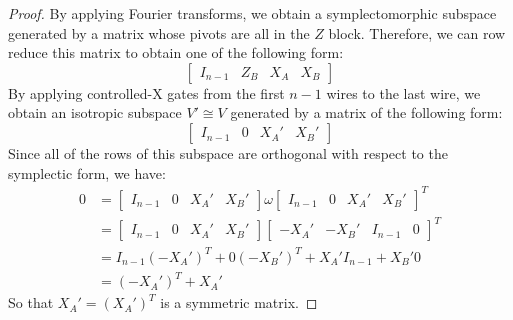 \begin{proof}
By applying Fourier transforms, we obtain a symplectomorphic subspace generated by a matrix whose pivots are all in the $Z$ block.  Therefore, we can row reduce this matrix to obtain one of the following form:
$$
\left[\begin{array}{cc|cc}
I_{n-1} & Z_B & X_A & X_B 
\end{array}\right]
$$
By applying controlled-{\cal X} gates from the first $n-1$ wires to the last wire, we obtain an isotropic subspace $V'\cong V$ generated by a matrix of the following form:
$$
\left[\begin{array}{cc|cc}
I_{n-1} & 0 & X_A' & X_B' 
\end{array}\right]
$$
Since all of the rows of this subspace are orthogonal with respect to the symplectic form, we have:
\begin{align*}
0 &=
\left[\begin{array}{cc|cc}
I_{n-1} & 0 & X_A' & X_B' 
\end{array}\right]
\omega
\left[\begin{array}{cc|cc}
I_{n-1} & 0 & X_A' & X_B' 
\end{array}\right]^T\\
&=
\left[\begin{array}{cc|cc}
I_{n-1} & 0 & X_A' & X_B' 
\end{array}\right]
\left[\begin{array}{cc|cc}
 -X_A' & -X_B'  & I_{n-1} & 0
\end{array}\right]^T\\
&=
I_{n-1}(-X_A')^T +  0( -X_B' )^T +X_A'I_{n-1} + X_B' 0 \\
&=
(-X_A')^T +X_A'
\end{align*}
So that  $X_A'=(X_A')^T$ is a symmetric matrix.


\end{proof}
